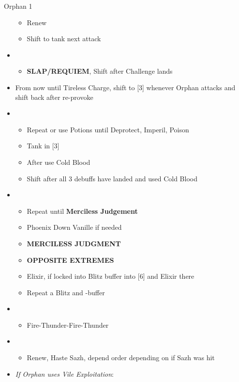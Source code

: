 \begin{battle}{Orphan 1}
\begin{multicols}{2}
\begin{itemize}
\begin{itemize}
        \item Renew
        \item Shift to tank next attack
    \end{itemize}
    \item \third
    \begin{itemize}
        \item \textbf{SLAP/REQUIEM}, Shift after Challenge lands
    \end{itemize}
    \vfill\null
    \columnbreak
    \item From now until Tireless Charge, shift to [3] whenever Orphan attacks and shift back after re-provoke
    \item \fifth
    \begin{itemize}
        \item Repeat or use Potions until Deprotect, Imperil, Poison
        \item Tank in [3]
        \item After \stagger use Cold Blood
        \item Shift after all 3 debuffs have landed and used Cold Blood
    \end{itemize}
    \item \first
    \begin{itemize}
        \item Repeat until \textbf{Merciless Judgement}
        \item Phoenix Down Vanille if needed
        \item \textbf{MERCILESS JUDGMENT}
        \item \textbf{OPPOSITE EXTREMES}
        \item Elixir, if locked into Blitz buffer into [6] and Elixir there
        \item Repeat a Blitz and \rav-buffer
    \end{itemize}
    \item \sixth
    \begin{itemize}
        \item Fire-Thunder-Fire-Thunder
    \end{itemize}
    \item \fourth
    \begin{itemize}
        \item Renew, Haste Sazh, depend order depending on if Sazh was hit
    \end{itemize}
    \item \textit{If Orphan uses Vile Exploitation}:
    \begin{itemize}

\end{itemize}
\end{itemize}
\end{multicols}
\end{battle}
